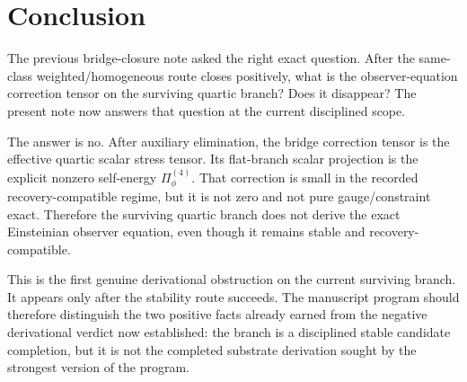 \documentclass[11pt]{article}
\begin{document}
\section{Conclusion}

The previous bridge-closure note asked the right exact question. After the same-class weighted/homogeneous route closes positively, what is the observer-equation correction tensor on the surviving quartic branch? Does it disappear? The present note now answers that question at the current disciplined scope.

The answer is no. After auxiliary elimination, the bridge correction tensor is the effective quartic scalar stress tensor. Its flat-branch scalar projection is the explicit nonzero self-energy \(\Pi_\phi^{(4)}\). That correction is small in the recorded recovery-compatible regime, but it is not zero and not pure gauge/constraint exact. Therefore the surviving quartic branch does not derive the exact Einsteinian observer equation, even though it remains stable and recovery-compatible.

This is the first genuine derivational obstruction on the current surviving branch. It appears only after the stability route succeeds. The manuscript program should therefore distinguish the two positive facts already earned from the negative derivational verdict now established: the branch is a disciplined stable candidate completion, but it is not the completed substrate derivation sought by the strongest version of the program.
\end{document}
